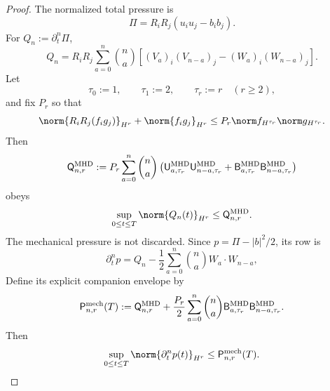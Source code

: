 \begin{proof}
The normalized total pressure is
\begin{equation}
 \Pi=R_iR_j(u_i u_j-b_i b_j).
 \label{eq:mhd-total-pressure}
\end{equation}
For \(Q_n:=\partial_t^n\Pi\),
\begin{equation}
 Q_n=R_iR_j\sum_{a=0}^n\binom na\left[
  (V_a)_i(V_{n-a})_j-(W_a)_i(W_{n-a})_j
 \right].
 \label{eq:mhd-total-pressure-recurrence}
\end{equation}
Let
\begin{equation}
 \tau_0:=1,\qquad \tau_1:=2,\qquad \tau_r:=r\quad(r\ge2),
 \label{eq:mhd-pressure-indices}
\end{equation}
and fix \(P_r\) so that
\begin{equation}
 \norm{R_iR_j(f_i g_j)}_{H^r}+\norm{f_i g_j}_{H^r}
 \le P_r\norm f_{H^{\tau_r}}\norm g_{H^{\tau_r}}.
 \label{eq:mhd-pressure-product}
\end{equation}
Then
\begin{equation}
 \mathsf Q_{n,r}^{\rm MHD}
 :=P_r\sum_{a=0}^n\binom na\left(
  \mathsf U_{a,\tau_r}^{\rm MHD}
  \mathsf U_{n-a,\tau_r}^{\rm MHD}
  +\mathsf B_{a,\tau_r}^{\rm MHD}
  \mathsf B_{n-a,\tau_r}^{\rm MHD}
 \right)
 \label{eq:mhd-total-pressure-envelope}
\end{equation}
obeys
\begin{equation}
 \sup_{0\le t\le T}\norm{Q_n(t)}_{H^r}
 \le\mathsf Q_{n,r}^{\rm MHD}.
 \label{eq:mhd-total-pressure-bound}
\end{equation}
The mechanical pressure is not discarded.  Since
\(p=\Pi-|b|^2/2\), its row is
\begin{equation}
 \partial_t^np
 =Q_n-\frac12\sum_{a=0}^n\binom na W_a\cdot W_{n-a},
 \label{eq:mhd-mechanical-pressure-recurrence}
\end{equation}
Define its explicit companion envelope by
\begin{equation}
 \mathsf P_{n,r}^{\rm mech}(T)
 :=\mathsf Q_{n,r}^{\rm MHD}
 +\frac{P_r}{2}\sum_{a=0}^n\binom na
  \mathsf B_{a,\tau_r}^{\rm MHD}
  \mathsf B_{n-a,\tau_r}^{\rm MHD}.
 \label{eq:mhd-mechanical-pressure-envelope}
\end{equation}
Then
\begin{equation}
 \sup_{0\le t\le T}\norm{\partial_t^np(t)}_{H^r}
 \le\mathsf P_{n,r}^{\rm mech}(T).
 \label{eq:mhd-mechanical-pressure-bound}
\end{equation}


\end{proof}
